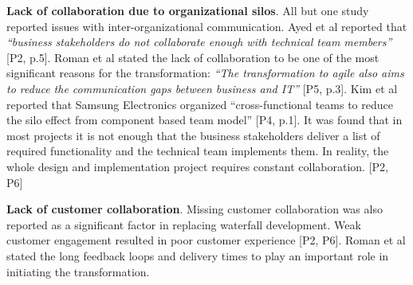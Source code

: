{\bfseries Lack of collaboration due to organizational silos}. All but
one study reported issues with inter-organizational communication. Ayed
et al reported that \textit{``business stakeholders do not collaborate
enough with technical team members''} [P2, p.5]. Roman et al stated the
lack of collaboration to be one of the most significant reasons for
the transformation: \textit{``The transformation to agile also aims
to reduce the communication gaps between business and IT''} [P5, p.3]. Kim
et al reported that Samsung Electronics organized ``cross-functional
teams to reduce the silo effect from component based team model'' [P4, p.1]. It
was found that in most projects it is not enough that the business
stakeholders deliver a list of required functionality and the technical
team implements them. In reality, the whole design and implementation
project requires constant collaboration. [P2, P6]

{\bfseries Lack of customer collaboration}. Missing customer
collaboration was also reported as a significant factor in replacing
waterfall development. Weak customer engagement resulted in poor
customer experience [P2, P6]. Roman et al stated the long feedback
loops and delivery times to play an important role in initiating the
transformation.
